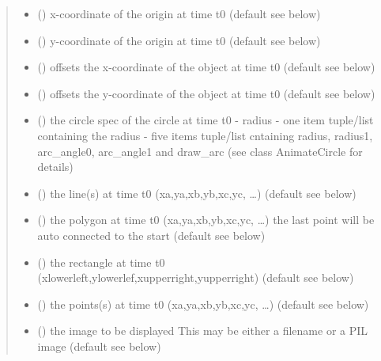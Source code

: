 \documentclass[letterpaper,10pt,english]{sphinxmanual}
\begin{document}
\begin{fulllineitems}
\begin{fulllineitems}
\begin{quote}
\begin{description}
\begin{itemize}
\item {} 
 () \textendash{} x-coordinate of the origin at time t0 (default see below)

\item {} 
 () \textendash{} y-coordinate of the origin at time t0 (default see below)

\item {} 
 () \textendash{} offsets the x-coordinate of the object at time t0 (default see below)

\item {} 
 () \textendash{} offsets the y-coordinate of the object at time t0 (default see below)

\item {} 
 () \textendash{} the circle spec of the circle at time t0 
- radius 
- one item tuple/list containing the radius 
- five items tuple/list cntaining radius, radius1, arc\_angle0, arc\_angle1 and draw\_arc
(see class AnimateCircle for details)

\item {} 
 () \textendash{} the line(s) at time t0 (xa,ya,xb,yb,xc,yc, …) (default see below)

\item {} 
 () \textendash{} the polygon at time t0 (xa,ya,xb,yb,xc,yc, …) 
the last point will be auto connected to the start (default see below)

\item {} 
 () \textendash{} the rectangle at time t0 
(xlowerleft,ylowerlef,xupperright,yupperright) (default see below)

\item {} 
 () \textendash{} the points(s) at time t0 (xa,ya,xb,yb,xc,yc, …) (default see below)

\item {} 
 () \textendash{} the image to be displayed 
This may be either a filename or a PIL image (default see below)


\end{itemize}
\end{description}
\end{quote}
\end{fulllineitems}
\end{fulllineitems}
\end{document}
